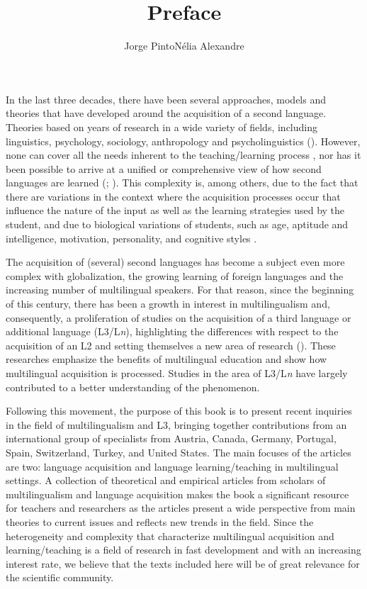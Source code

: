 \documentclass[output=paper]{langsci/langscibook}
\title{Preface}
\author{Jorge Pinto\affiliation{Centro de Linguística da Universidade de Lisboa}\lastand Nélia Alexandre \affiliation{Centro de Linguística da Universidade de Lisboa}}
\begin{document}
\maketitle

\noindent In the last three decades, there have been several approaches, models and theories that have developed around the acquisition of a second language. Theories based on years of research in a wide variety of fields, including linguistics, psychology, sociology, anthropology and psycholinguistics (\citealt{FreemanFreeman2001}). However, none can cover all the needs inherent to the teaching\slash learning process \citep{Cook2001Second}, nor has it been possible to arrive at a unified or comprehensive view of how second languages are learned (\citealt{MitchelMyles2004}; \citealt{Nunan2001}). This complexity is, among others, due to the fact that there are variations in the context where the acquisition processes occur that influence the nature of the input as well as the learning strategies used by the student, and due to biological variations of students, such as age, aptitude and intelligence, motivation, personality, and cognitive styles \citep{Ellis1989}.

The acquisition of (several) second languages has become a subject even more complex with globalization, the growing learning of foreign languages and the increasing number of multilingual speakers. For that reason, since the beginning of this century, there has been a growth in interest in multilingualism and, consequently, a proliferation of studies on the acquisition of a third language or additional language (L3\slash L\textit{n}), highlighting the differences with respect to the acquisition of an L2 and setting themselves a new area of research (\citealt{Jessner1999,HerdinaJessner2000,Cook2001Second,Cenoz2003}). These researches emphasize the benefits of multilingual education and show how multilingual acquisition is processed. Studies in the area of L3\slash L\textit{n} have largely contributed to a better understanding of the phenomenon.

Following this movement, the purpose of this book is to present recent inquiries in the field of multilingualism and L3, bringing together contributions from an international group of specialists from Austria, Canada, Germany, Portugal, Spain, Switzerland, Turkey, and United States. The main focuses of the articles are two: language acquisition and language learning\slash teaching in multilingual settings. A collection of theoretical and empirical articles from scholars of multilingualism and language acquisition makes the book a significant resource for teachers and researchers as the articles present a wide perspective from main theories to current issues and reflects new trends in the field. Since the heterogeneity and complexity that characterize multilingual acquisition and learning/teaching is a field of research in fast development and with an increasing interest rate, we believe that the texts included here will be of great relevance for the scientific community. 
\end{document}

